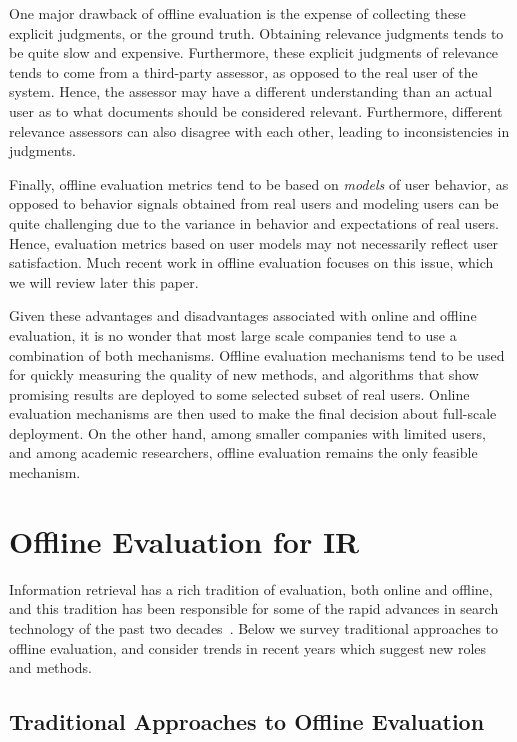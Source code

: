 One major drawback of offline evaluation is the expense of collecting these explicit judgments, or the ground truth. Obtaining relevance judgments tends to be quite slow and expensive. Furthermore, these explicit judgments of relevance tends to come from a third-party assessor, as opposed to the real user of the system. Hence, the assessor may have a different understanding than an actual user as to what documents should be considered relevant. Furthermore, different relevance assessors can also disagree with each other, leading to inconsistencies in judgments. 

Finally, offline evaluation metrics tend to be based on \emph{models} of user behavior, as opposed to behavior signals obtained from real users and modeling users can be quite challenging due to the variance in behavior and expectations of real users. Hence, evaluation metrics based on user models may not necessarily reflect user satisfaction. Much recent work in offline evaluation focuses on this issue, which we will review later this paper.

Given these advantages and disadvantages associated with online and offline evaluation, it is no wonder that most large scale companies tend to use a combination of both mechanisms. Offline evaluation mechanisms tend to be used for quickly measuring the quality of new methods, and algorithms that show promising results are deployed to some selected subset of real users. Online evaluation mechanisms are then used to make the final decision about full-scale deployment. On the other hand, among smaller companies with limited users, and among academic researchers, offline evaluation remains the only feasible mechanism. 

\section{Offline Evaluation for IR}

Information retrieval has a rich tradition of evaluation, both online and offline, and this tradition has been responsible for some of the rapid advances in search technology of the past two decades~\citep{TRECimpact}. Below we survey traditional approaches to offline evaluation, and consider trends in recent years which suggest new roles and methods.

\subsection{Traditional Approaches to Offline Evaluation}

